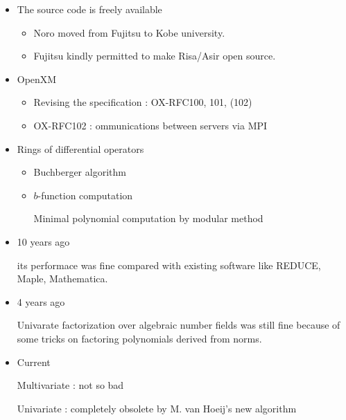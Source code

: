 \begin{slide}{}
\begin{itemize}
\item The source code is freely available

\begin{itemize}
\item Noro moved from Fujitsu to Kobe university.

\item Fujitsu kindly permitted to make Risa/Asir open source.
\end{itemize}

\item OpenXM

\begin{itemize}
\item Revising the specification : OX-RFC100, 101, (102)

\item OX-RFC102 : ommunications between servers via MPI
\end{itemize}

\item Rings of differential operators

\begin{itemize}
\item Buchberger algorithm

\item $b$-function computation

Minimal polynomial computation by modular method
\end{itemize}
\end{itemize}

\end{slide}

\begin{slide}{}

\begin{itemize}
\item 10 years ago

its performace was fine compared with existing software
like REDUCE, Maple, Mathematica.

\item 4 years ago

Univarate factorization over algebraic number fields was
still fine because of some tricks on factoring polynomials
derived from norms.

\item Current

Multivariate : not so bad

Univariate : completely obsolete by M. van Hoeij's new algorithm
\end{itemize}

\end{slide}

